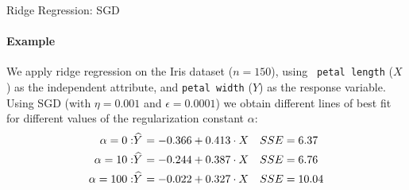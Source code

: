 %
%
%
%
%
%
%
%
%
\begin{frame}{Ridge Regression: SGD}
\framesubtitle{Example}
We apply ridge regression on the Iris dataset ($n=150$), using {\tt
petal length} ($X$) as the independent attribute, and {\tt petal width}
($Y$) as the response variable. Using SGD (with $\eta=0.001$ and
$\epsilon=0.0001$) we obtain different lines of best fit for different
values of the regularization constant $\alpha$:
    \begin{align*}
        \alpha = 0: & \mkern 1.5mu\widehat{\mkern-1.5muY}\mkern 1.5mu = -0.366 + 0.413 \cdot X 
        & SSE & = 6.37\\
        \alpha = 10: & \mkern 1.5mu\widehat{\mkern-1.5muY}\mkern 1.5mu = -0.244 + 0.387 \cdot X
       & SSE & = 6.76 \\
       \alpha = 100: & \mkern 1.5mu\widehat{\mkern-1.5muY}\mkern 1.5mu = -0.022 + 0.327 \cdot X
       & SSE & = 10.04
    \end{align*}
\end{frame}

